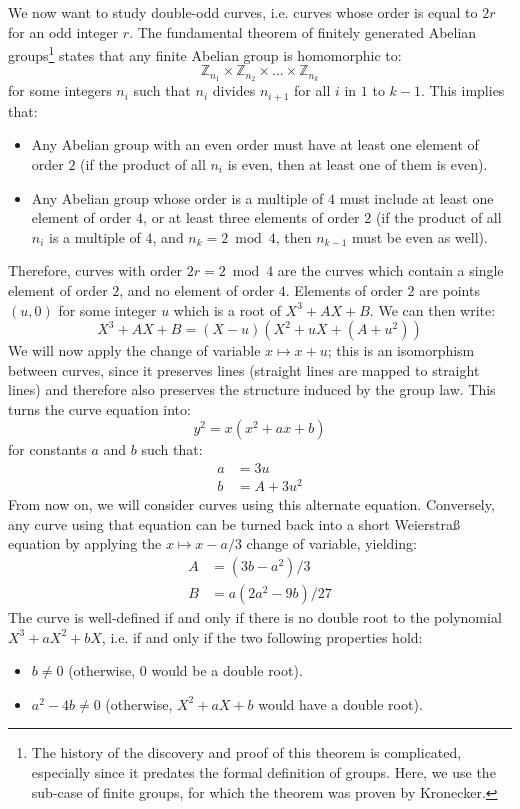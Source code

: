 \documentclass{llncs}
\newcommand{\bZ}{\mathbb{Z}}
\begin{document}
We now want to study double-odd curves, i.e. curves whose order is equal
to $2r$ for an odd integer $r$. The fundamental theorem of finitely
generated Abelian groups\footnote{The history of the discovery and proof
of this theorem is complicated, especially since it predates the formal
definition of groups. Here, we use the sub-case of finite groups, for
which the theorem was proven by Kronecker\cite{Kro1870}.} states that
any finite Abelian group is homomorphic to:
$$ \bZ_{n_1} \times \bZ_{n_2} \times ... \times \bZ_{n_k} $$
for some integers $n_i$ such that $n_i$ divides $n_{i+1}$ for all
$i$ in $1$ to $k-1$. This implies that:
\begin{itemize}

    \item Any Abelian group with an even order must have at least one
    element of order $2$ (if the product of all $n_i$ is even, then at
    least one of them is even).

    \item Any Abelian group whose order is a multiple of $4$ must
    include at least one element of order $4$, or at least three
    elements of order $2$ (if the product of all $n_i$ is a multiple
    of $4$, and $n_k = 2\bmod 4$, then $n_{k-1}$ must be even as
    well).

\end{itemize}
Therefore, curves with order $2r = 2 \bmod 4$ are the curves which
contain a single element of order $2$, and no element of order $4$.
Elements of order $2$ are points $(u, 0)$ for some integer $u$ which
is a root of $X^3 + AX + B$. We can then write:
    $$ X^3 + AX + B = (X - u) (X^2 + uX + (A + u^2)) $$
We will now apply the change of variable $x \mapsto x + u$; this is an
isomorphism between curves, since it preserves lines (straight lines are
mapped to straight lines) and therefore also preserves the structure
induced by the group law. This turns the curve equation into:
    $$ y^2 = x (x^2 + ax + b) $$
for constants $a$ and $b$ such that:
\begin{align*}
    a &= 3u \\
    b &= A + 3u^2
\end{align*}
From now on, we will consider curves using this alternate equation.
Conversely, any curve using that equation can be turned back into a
short Weierstraß equation by applying the $x \mapsto x - a/3$
change of variable, yielding:
\begin{align*}
    A &= (3b - a^2) / 3 \\
    B &= a(2a^2 - 9b) / 27
\end{align*}
The curve is well-defined if and only if there is no double root to
the polynomial $X^3 + aX^2 + bX$, i.e. if and only if the two following
properties hold:
\begin{itemize}

    \item $b \neq 0$ (otherwise, $0$ would be a double root).

    \item $a^2 - 4b \neq 0$ (otherwise, $X^2+aX+b$ would have a
    double root).

\end{itemize}
\end{document}

